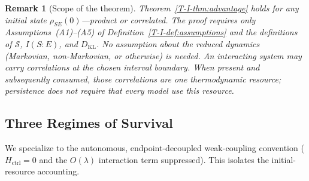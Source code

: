 \documentclass[12pt,a4paper,openany]{book}
\newtheorem{remark}[theorem]{Remark}
\begin{document}
\begin{remark}[Scope of the theorem]
\label{T-I-rem:no_product}
Theorem~\ref{T-I-thm:advantage} holds for \emph{any} initial
state $\rho_{SE}(0)$---product or correlated.
The proof requires only
Assumptions~\textup{(A1)--(A5)} of
Definition~\ref{T-I-def:assumptions} and the definitions of
$\mathcal{S}$, $I(S{:}E)$, and $D_{\mathrm{KL}}$.
No assumption about the reduced dynamics (Markovian,
non-Markovian, or otherwise) is needed.
An interacting system may carry correlations at the chosen interval
boundary.  When present and subsequently consumed, those correlations
are one thermodynamic resource; persistence does not require that every
model use this resource.
\end{remark}

\subsection{Three Regimes of Survival}

We specialize to the autonomous, endpoint-decoupled weak-coupling
convention ($H_{\mathrm{ctrl}} = 0$ and the $O(\lambda)$ interaction
term suppressed).  This isolates the initial-resource accounting.
\end{document}
